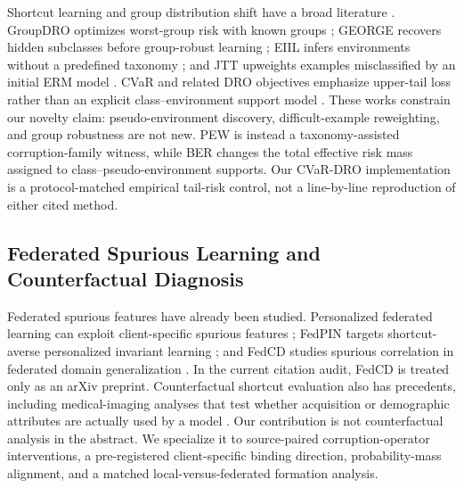 Shortcut learning and group distribution shift have a broad literature \citep{geirhos2020shortcut}. GroupDRO optimizes worst-group risk with known groups \citep{sagawa2020groupdro}; GEORGE recovers hidden subclasses before group-robust learning \citep{sohoni2020george}; EIIL infers environments without a predefined taxonomy \citep{creager2021eiil}; and JTT upweights examples misclassified by an initial ERM model \citep{liu2021jtt}. CVaR and related DRO objectives emphasize upper-tail loss rather than an explicit class--environment support model \citep{rockafellar2000cvar,duchi2021uniform}. These works constrain our novelty claim: pseudo-environment discovery, difficult-example reweighting, and group robustness are not new. PEW is instead a taxonomy-assisted corruption-family witness, while BER changes the total effective risk mass assigned to class--pseudo-environment supports. Our CVaR-DRO implementation is a protocol-matched empirical tail-risk control, not a line-by-line reproduction of either cited method.

\subsection{Federated Spurious Learning and Counterfactual Diagnosis}

Federated spurious features have already been studied. Personalized federated learning can exploit client-specific spurious features \citep{wang2024pflspurious}; FedPIN targets shortcut-averse personalized invariant learning \citep{tang2024fedpin}; and FedCD studies spurious correlation in federated domain generalization \citep{ma2024fedcd}. In the current citation audit, FedCD is treated only as an arXiv preprint. Counterfactual shortcut evaluation also has precedents, including medical-imaging analyses that test whether acquisition or demographic attributes are actually used by a model \citep{vigneshwaran2026counterfactual,jabbour2020chestxray}. Our contribution is not counterfactual analysis in the abstract. We specialize it to source-paired corruption-operator interventions, a pre-registered client-specific binding direction, probability-mass alignment, and a matched local-versus-federated formation analysis.
